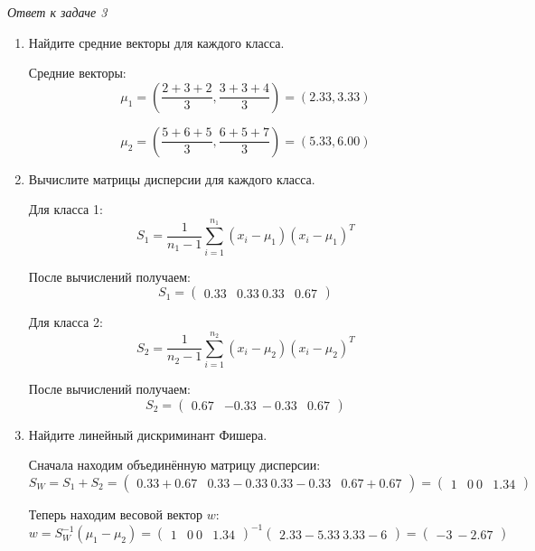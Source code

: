 \textit{Ответ к задаче 3}
\begin{enumerate}
    \item Найдите средние векторы для каждого класса.

          Средние векторы:
          \[
              \mu_1 = \left(\frac{2+3+2}{3}, \frac{3+3+4}{3}\right) = \left(2.33, 3.33\right)
          \]

          \[
              \mu_2 = \left(\frac{5+6+5}{3}, \frac{6+5+7}{3}\right) = \left(5.33, 6.00\right)
          \]

    \item Вычислите матрицы дисперсии для каждого класса.

          Для класса 1:
          \[
              S_1 = \frac{1}{n_1-1} \sum_{i=1}^{n_1} (x_i - \mu_1)(x_i - \mu_1)^T
          \]

          После вычислений получаем:
          \[
              S_1 = \begin{pmatrix}
                  0.33 & 0.33 \
                  0.33 & 0.67
              \end{pmatrix}
          \]

          Для класса 2:
          \[
              S_2 = \frac{1}{n_2-1} \sum_{i=1}^{n_2} (x_i - \mu_2)(x_i - \mu_2)^T
          \]

          После вычислений получаем:
          \[
              S_2 = \begin{pmatrix}
                  0.67  & -0.33 \
                  -0.33 & 0.67
              \end{pmatrix}
          \]

    \item Найдите линейный дискриминант Фишера.

          Сначала находим объединённую матрицу дисперсии:
          \[
              S_W = S_1 + S_2 =
              \begin{pmatrix}
                  0.33 + 0.67 & 0.33 - 0.33 \
                  0.33 - 0.33 & 0.67 + 0.67
              \end{pmatrix}
              =
              \begin{pmatrix}
                  1 & 0 \
                  0 & 1.34
              \end{pmatrix}
          \]

          Теперь находим весовой вектор $w$:
          \[
              w = S_W^{-1}(\mu_1 - \mu_2) =
              \begin{pmatrix}
                  1 & 0 \
                  0 & 1.34
              \end{pmatrix}^{-1}
              \begin{pmatrix}
                  2.33 - 5.33 \
                  3.33 - 6
              \end{pmatrix}
              =
              \begin{pmatrix}
                  -3 \
                  -2.67
              \end{pmatrix}
          \]
\end{enumerate}

